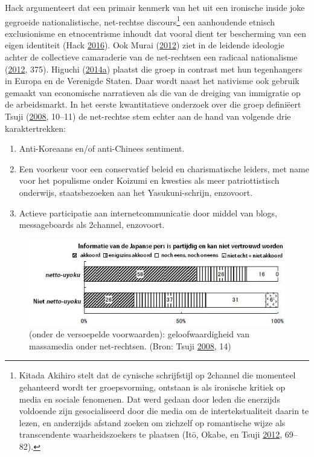 \documentclass[10.5pt,dutch,]{article}
\providecommand{\tightlist}{%
  \setlength{\itemsep}{0pt}\setlength{\parskip}{0pt}}
\begin{document}
Hack argumenteert dat een primair kenmerk van het uit een ironische
inside joke gegroeide nationalistische, net-rechtse discours\footnote{Kitada
  Akihiro stelt dat de cynische schrijfstijl op 2channel die momenteel
  gehanteerd wordt ter groepsvorming, ontstaan is als ironische kritiek
  op media en sociale fenomenen. Dat werd gedaan door leden die
  enerzijds voldoende zijn gesocialiseerd door die media om de
  intertekstualiteit daarin te lezen, en anderzijds afstand zoeken om
  zichzelf op romantische wijze als transcendente waarheidszoekers te
  plaatsen (Itō, Okabe, en Tsuji
  \protect\hyperlink{ref-itoux5ffandomux5f2012}{2012}, 69--82).} een
aanhoudende etnisch exclusionisme en etnocentrisme inhoudt dat vooral
dient ter bescherming van een eigen identiteit (Hack
\protect\hyperlink{ref-hackux5fsubcultureux5f2016}{2016}). Ook Murai
(\protect\hyperlink{ref-muraiux5fnetux5f2012}{2012}) ziet in de leidende
ideologie achter de collectieve camaraderie van de net-rechtsen een
radicaal nationalisme
(\protect\hyperlink{ref-muraiux5fnetux5f2012}{2012}, 375). Higuchi
(\protect\hyperlink{ref-higuchiux5fjapansux5f2014}{2014}\protect\hyperlink{ref-higuchiux5fjapansux5f2014}{a})
plaatst die groep in contrast met hun tegenhangers in Europa en de
Verenigde Staten. Daar wordt naast het nativisme ook gebruik gemaakt van
economische narratieven als die van de dreiging van immigratie op de
arbeidsmarkt. In het eerste kwantitatieve onderzoek over die groep
definiëert Tsuji
(\protect\hyperlink{ref-tsujiux5fintanettoux5f2008}{2008}, 10--11) de
net-rechtse stem echter aan de hand van volgende drie karaktertrekken:

\begin{enumerate}
\def\labelenumi{\arabic{enumi}.}
\tightlist
\item
  Anti-Koreaans en/of anti-Chinees sentiment.
\item
  Een voorkeur voor een conservatief beleid en charismatische leiders,
  met name voor het populisme onder Koizumi en kwesties als meer
  patriottistisch onderwijs, staatsbezoeken aan het Yasukuni-schrijn,
  enzovoort.
\item
  Actieve participatie aan internetcommunicatie door middel van blogs,
  messageboards als 2channel, enzovoort.
\end{enumerate}

\begin{figure}[htbp]
\centering
\includegraphics{images/tsuji_masukomi_translated.jpg}
\caption{(onder de versoepelde voorwaarden): geloofwaardigheid van
massamedia onder net-rechtsen. (Bron: Tsuji
\protect\hyperlink{ref-tsujiux5fintanettoux5f2008}{2008}, 14)}
\end{figure}
\end{document}
